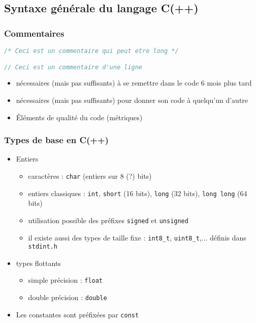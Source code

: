 

\subsection{Syntaxe générale du langage C(++)}

\begin{frame}[fragile]
\frametitle{Commentaires}
\begin{lstlisting}[language=C++]
/* Ceci est un commentaire qui peut etre long */

// Ceci est un commentaire d'une ligne
\end{lstlisting}
\begin{itemize}
\item nécessaires (mais pas suffisants) à se remettre dans le code 6 mois plus tard
\item nécessaires (mais pas suffisants) pour donner son code à quelqu'un d'autre
\item Éléments de qualité du code (métriques)
\end{itemize}

\end{frame}


\begin{frame}[fragile]
\frametitle{Types de base en C(++)}
\begin{itemize}
\item Entiers
\begin{itemize}
\item caractères : \verb|char| (entiers sur 8 (?) bits)
\item entiers classiques : \verb|int|, \verb|short| (16 bits), \verb|long| (32 bits), \verb|long long| (64 bits)
\item utilisation possible des préfixes \verb|signed| et \verb|unsigned|
\item il existe aussi des types de taille fixe : \verb|int8_t|, \verb|uint8_t|,... définis dans \verb|stdint.h|
\end{itemize}
\item types flottants
\begin{itemize}
\item simple précision : \verb|float|
\item double précision : \verb|double|
\end{itemize}
\item Les constantes sont préfixées par \verb|const|
\end{itemize}
\end{frame}

